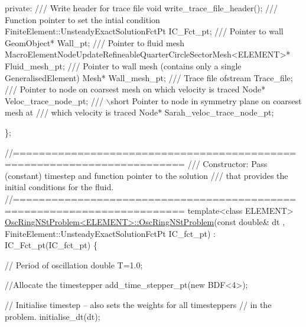 \begin{DoxyCodeInclude}
\textcolor{keyword}{private}:
\textcolor{comment}{}
\textcolor{comment}{ /// Write header for trace file}
\textcolor{comment}{} \textcolor{keywordtype}{void} write\_trace\_file\_header();
\textcolor{comment}{}
\textcolor{comment}{ /// Function pointer to set the intial condition}
\textcolor{comment}{} FiniteElement::UnsteadyExactSolutionFctPt IC\_Fct\_pt;
\textcolor{comment}{}
\textcolor{comment}{ /// Pointer to wall}
\textcolor{comment}{} GeomObject* Wall\_pt;
\textcolor{comment}{}
\textcolor{comment}{ /// Pointer to fluid mesh}
\textcolor{comment}{} MacroElementNodeUpdateRefineableQuarterCircleSectorMesh<ELEMENT>* Fluid\_mesh\_pt;
\textcolor{comment}{}
\textcolor{comment}{ /// Pointer to wall mesh (contains only a single GeneralisedElement)}
\textcolor{comment}{} Mesh* Wall\_mesh\_pt;
\textcolor{comment}{}
\textcolor{comment}{ /// Trace file}
\textcolor{comment}{} ofstream Trace\_file;
\textcolor{comment}{}
\textcolor{comment}{ /// Pointer to node on coarsest mesh on which velocity is traced}
\textcolor{comment}{} Node* Veloc\_trace\_node\_pt;
\textcolor{comment}{}
\textcolor{comment}{ /// \(\backslash\)short Pointer to node in symmetry plane on coarsest mesh at }
\textcolor{comment}{ /// which velocity is traced}
\textcolor{comment}{} Node* Sarah\_veloc\_trace\_node\_pt;

\};


\textcolor{comment}{//========================================================================}\textcolor{comment}{}
\textcolor{comment}{/// Constructor: Pass (constant) timestep and function pointer to the solution }
\textcolor{comment}{/// that provides the initial conditions for the fluid.}
\textcolor{comment}{}\textcolor{comment}{//========================================================================}
\textcolor{keyword}{template}<\textcolor{keyword}{class} ELEMENT>
\hyperlink{classOscRingNStProblem_acd5f633c43eb4cfb43c45361ecf85e6b}{OscRingNStProblem<ELEMENT>::OscRingNStProblem}(\textcolor{keyword}{const} \textcolor{keywordtype}{double}& dt
      , 
FiniteElement::UnsteadyExactSolutionFctPt IC\_fct\_pt) : IC\_Fct\_pt(IC\_fct\_pt)
\{ 

 \textcolor{comment}{// Period of oscillation}
 \textcolor{keywordtype}{double} T=1.0;

 \textcolor{comment}{//Allocate the timestepper}
 add\_time\_stepper\_pt(\textcolor{keyword}{new} BDF<4>);

 \textcolor{comment}{// Initialise timestep -- also sets the weights for all timesteppers}
 \textcolor{comment}{// in the problem.}
 initialise\_dt(dt);


\end{DoxyCodeInclude}
